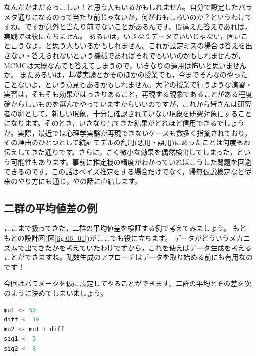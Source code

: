 \documentclass{ltjsbook}
\begin{document}
なんだかまだるっこしい！と思う人もいるかもしれません。自分で設定したパラメタ通りになるのって当たり前じゃないか，何がおもしろいのか？というわけですね。ですが意外と当たり前でないことがあるんです。間違えた答えであれば，実践では役に立ちません。
あるいは，いきなりデータでいいじゃない，固いこと言うなよ，と思う人もいるかもしれません。これが設定ミスの場合は答えを出さない・答えられないという機械であればそれでもいいのかもしれませんが，MCMCは大概なんでも答えてしまうので，いきなりの運用は怖いと思いませんか。
またあるいは，基礎実験とかそのほかの授業でも，今までそんなのやったことないよ，という意見もあるかもしれません。大学の授業で行うような演習・実習は，そもそも効果がはっきりあること，再現する現象であることがある程度確からしいものを選んでやっていますからいいのですが，これから皆さんは研究者の卵として，新しい現象，十分に確認されていない現象を研究対象にすることになります。そのとき，いきなり出てきた結果がどれほど信用できるでしょうか。実際，最近では心理学実験が再現できないケースも数多く指摘されており，その理由のひとつとして統計モデルの乱用(悪用・誤用)にあったことは何度もお伝えしてきた通りです。さらに，ごく微小な効果を偶然検出してしまった，という可能性もあります。事前に推定機の精度がわかっていればこうした問題を回避できるのです。この話はベイズ推定をする場合だけでなく，帰無仮説検定など従来のやり方にも通じ，やの話に直結します。

\subsection{二群の平均値差の例}
ここまで扱ってきた，二群の平均値差を検証する例で考えてみましょう。
もともとの設計図(図\ref{fig:06_01})がここでも役に立ちます。
データがどういうメカニズムで出てきたかを考えていたわけですから，これを使えばデータ生成を考えることができますね。乱数生成のアプローチはデータを取り始める前にも有用なのです！

今回はパラメータを仮に設定してやることができます。二群の平均とその差を次のように決めてしまいましょう。
\begin{lstlisting}[language=c++,label={code:07_04},caption={平均値差の設定}]
mu1 <- 50
diff <- 10
mu2 <- mu1 + diff
sig1 <- 5
sig2 <- 8
\end{lstlisting}
\end{document}
